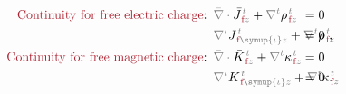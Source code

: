 \begin{subequations} \label{eq:Div-em-f}
	\abovedisplayskip=-4pt
	\belowdisplayskip=10pt
\begin{align}
	\hspace{-2.5em} \textcolor{Maroon}{\text{Continuity for free electric charge}}\text{:}&\hspace{0.5em} \mathcolor{gray}{\bar{\nabla} \cdot} \bar{J}^{\;\!\mathcolor{gray}{t}}_{\;\!\textcolor{Maroon}{\text{f}}\mathcolor{gray}{z}} + \mathcolor{gray}{\nabla^t} {\rho}^{\;\!\mathcolor{gray}{t}}_{\;\!\textcolor{Maroon}{\text{f}}\mathcolor{gray}{z}} \hspace{-4.0em} &&= 0 \label{eq:Div-e-f} \\
	\hspace{-2.5em} &\hspace{0.5em} \mathcolor{gray}{\nabla^\iota} J^{\;\!\mathcolor{gray}{t}}_{\;\!\textcolor{Maroon}{\text{f}} \mathcolor{gray}{\symup{\iota}}\mathcolor{gray}{z}} + \mathcolor{gray}{\nabla^t} {\rho}^{\;\!\mathcolor{gray}{t}}_{\;\!\textcolor{Maroon}{\text{f}}\mathcolor{gray}{z}} \hspace{-4.0em} &&= 0~, \label{eq:div-e-f} \\
	\hspace{-2.5em} \textcolor{Maroon}{\text{Continuity for free magnetic charge}}\text{:}&\hspace{0.5em} \mathcolor{gray}{\bar{\nabla} \cdot} \bar{K}^{\;\!\mathcolor{gray}{t}}_{\;\!\textcolor{Maroon}{\text{f}}\mathcolor{gray}{z}} + \mathcolor{gray}{\nabla^t} {\kappa}^{\;\!\mathcolor{gray}{t}}_{\;\!\textcolor{Maroon}{\text{f}}\mathcolor{gray}{z}} \hspace{-4.0em} &&= 0 \label{eq:Div-m-f} \\
	\hspace{-2.5em} &\hspace{0.5em} \mathcolor{gray}{\nabla^\iota} {K}^{\;\!\mathcolor{gray}{t}}_{\;\!\textcolor{Maroon}{\text{f}} \mathcolor{gray}{\symup{\iota}}\mathcolor{gray}{z}} + \mathcolor{gray}{\nabla^t} {\kappa}^{\;\!\mathcolor{gray}{t}}_{\;\!\textcolor{Maroon}{\text{f}}\mathcolor{gray}{z}} \hspace{-4.0em} &&= 0~. \label{eq:div-m-f}
\end{align}
\end{subequations}
